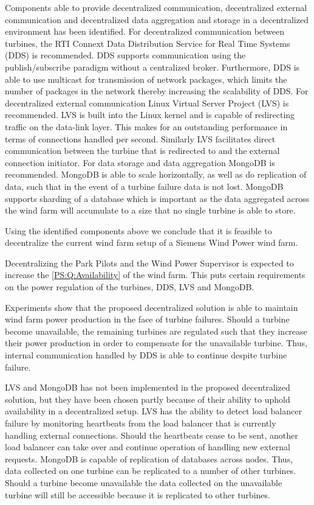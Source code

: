 Components able to provide decentralized communication, decentralized external communication and decentralized data aggregation and storage in a decentralized environment has been identified. For decentralized communication between turbines, the RTI Connext Data Distribution Service for Real Time Systems (DDS) is recommended. DDS supports communication using the publish/subscribe paradigm without a centralized broker. Furthermore, DDS is able to use multicast for transmission of network packages, which limits the number of packages in the network thereby increasing the scalability of DDS. For decentralized external communication Linux Virtual Server Project (LVS) is recommended. LVS is built into the Linux kernel and is capable of redirecting traffic on the data-link layer. This makes for an outstanding performance in terms of connections handled per second. Similarly LVS facilitates direct communication between the turbine that is redirected to and the external connection initiator. For data storage and data aggregation MongoDB is recommended. MongoDB is able to scale horizontally, as well as do replication of data, such that in the event of a turbine failure data is not lost. MongoDB supports sharding of a database which is important as the data aggregated across the wind farm will accumulate to a size that no single turbine is able to store.

Using the identified components above we conclude that it is feasible to decentralize the current wind farm setup of a Siemens Wind Power wind farm.

Decentralizing the Park Pilots and the Wind Power Supervisor is expected to increase the \ref{PS:Q:Availability} of the wind farm. This puts certain requirements on the power regulation of the turbines, DDS, LVS and MongoDB.

Experiments show that the proposed decentralized solution is able to maintain wind farm power production in the face of turbine failures. Should a turbine become unavailable, the remaining turbines are regulated such that they increase their power production in order to compensate for the unavailable turbine. Thus, internal communication handled by DDS is able to continue despite turbine failure.

LVS and MongoDB has not been implemented in the proposed decentralized solution, but they have been chosen partly because of their ability to uphold availability in a decentralized setup. LVS has the ability to detect load balancer failure by monitoring heartbeats from the load balancer that is currently handling external connections. Should the heartbeats cease to be sent, another load balancer can take over and continue operation of handling new external requests. MongoDB is capable of replication of databases across nodes. Thus, data collected on one turbine can be replicated to a number of other turbines. Should a turbine become unavailable the data collected on the unavailable turbine will still be accessible because it is replicated to other turbines. 


